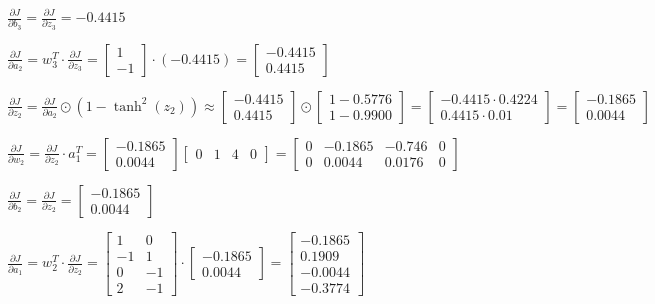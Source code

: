 $
\frac{\partial J}{\partial b_3} = \frac{\partial J}{\partial z_3} = -0.4415
$

$
\frac{\partial J}{\partial a_2} = w_3^T \cdot \frac{\partial J}{\partial z_3} = 
\begin{bmatrix} 1 \\ -1 \end{bmatrix} \cdot (-0.4415)
= \begin{bmatrix} -0.4415 \\ 0.4415 \end{bmatrix}
$

$
\frac{\partial J}{\partial z_2} = \frac{\partial J}{\partial a_2} \odot (1 - \tanh^2(z_2)) \approx 
\begin{bmatrix} -0.4415 \\ 0.4415 \end{bmatrix} 
\odot \begin{bmatrix} 1 - 0.5776 \\ 1 - 0.9900 \end{bmatrix}
= \begin{bmatrix} -0.4415 \cdot 0.4224 \\ 0.4415 \cdot 0.01 \end{bmatrix}
= \begin{bmatrix} -0.1865 \\ 0.0044 \end{bmatrix}
$

$
\frac{\partial J}{\partial w_2} = \frac{\partial J}{\partial z_2} \cdot a_1^T =
\begin{bmatrix}
-0.1865 \\
0.0044
\end{bmatrix}
\begin{bmatrix}
0 & 1 & 4 & 0
\end{bmatrix}
=
\begin{bmatrix}
0 & -0.1865 & -0.746 & 0 \\
0 & 0.0044 & 0.0176 & 0
\end{bmatrix}
$

$
\frac{\partial J}{\partial b_2} = \frac{\partial J}{\partial z_2} = \begin{bmatrix} -0.1865 \\ 0.0044 \end{bmatrix}
$

$
\frac{\partial J}{\partial a_1} = w_2^T \cdot \frac{\partial J}{\partial z_2} =
\begin{bmatrix}
1 & 0 \\
-1 & 1 \\
0 & -1 \\
2 & -1 
\end{bmatrix}
\cdot
\begin{bmatrix}
-0.1865 \\ 0.0044
\end{bmatrix}
=
\begin{bmatrix}
-0.1865 \\
0.1909 \\
-0.0044 \\
-0.3774
\end{bmatrix}
$

